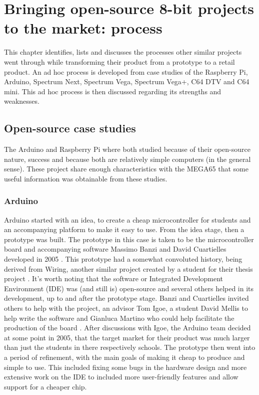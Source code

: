 
\chapter{Bringing open-source 8-bit projects to the market: process}
\label{Chapter4}

This chapter identifies, lists and discusses the processes other similar projects went through while transforming their product from a prototype to a retail product. An ad hoc process is developed from case studies of the Raspberry Pi, Arduino, Spectrum Next, Spectrum Vega, Spectrum Vega+, C64 DTV and C64 mini. This ad hoc process is then discussed regarding its strengths and weaknesses.
\section{Open-source case studies}
The Arduino and Raspberry Pi where both studied because of their open-source nature, success and because both are relatively simple computers (in the general sense). These project share enough characteristics with the MEGA65 that some useful information was obtainable from these studies.

\subsection{Arduino}
Arduino started with an idea, to create a cheap microcontroller for students and an accompanying platform to make it easy to use. From the idea stage, then a prototype was built. The prototype in this case is taken to be the microcontroller board and accompanying software Massimo Banzi and David Cuartielles developed in 2005 \cite{RN111}. This prototype had a somewhat convoluted history, being derived from Wiring, another similar project created by a student for their thesis project \cite{RN110}\cite{RN111}. It's worth noting that the software or Integrated Development Environment (IDE) was (and still is) open-source and several others helped in its development, up to and after the prototype stage. Banzi and Cuartielles invited others to help with the project, an advisor Tom Igoe, a student David Mellis to help write the software and Gianluca Martino who could help facilitate the production of the board 
\cite{RN111}. After discussions with Igoe, the Arduino team decided at some point in 2005, that the target market for their product was much larger than just the students in there respectively schools. The prototype then went into a period of refinement, with the main goals of making it cheap to produce and simple to use. This included fixing some bugs in the hardware design 
\cite{RN111} and more extensive work on the IDE to included more user-friendly features and allow support for a cheaper chip.

